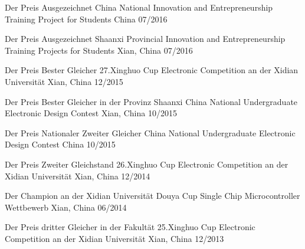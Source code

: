 \begin{cvhonors}

  \cvhonor
    {Der Preis Ausgezeichnet} %
    {China National Innovation and Entrepreneurship Training Project for Students} %
    {China} %
    {07/2016} %

  \cvhonor
    {Der Preis Ausgezeichnet} %
    {Shaanxi Provincial Innovation and Entrepreneurship Training Projects for Students} %
    {Xian, China} %
    {07/2016} %

  \cvhonor
    {Der Preis Bester Gleicher} %
    {27.Xinghuo Cup Electronic Competition an der Xidian Universität} %
    {Xian, China} %
    {12/2015} %

  \cvhonor
	{Der Preis Bester Gleicher in der Provinz Shaanxi} %
	{China National Undergraduate Electronic Design Contest} %
	{Xian, China} %
	{10/2015} %

  \cvhonor
	{Der Preis Nationaler Zweiter Gleicher} %
	{China National Undergraduate Electronic Design Contest} %
	{China} %
	{10/2015} %

  \cvhonor
	{Der Preis Zweiter Gleichstand } %
	{26.Xinghuo Cup Electronic Competition an der Xidian Universität} %
	{Xian, China} %
	{12/2014} %

  \cvhonor
	{Der Champion an der Xidian Universität} %
	{Douya Cup Single Chip Microcontroller Wettbewerb} %
	{Xian, China} %
	{06/2014} %

  \cvhonor
	{Der Preis dritter Gleicher in der Fakultät} %
	{25.Xinghuo Cup Electronic Competition an der Xidian Universität} %
	{Xian, China} %
	{12/2013} %

 

\end{cvhonors}

